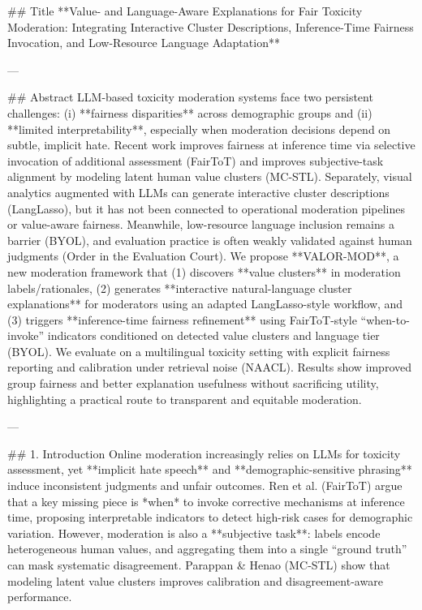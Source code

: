 ## Title
**Value- and Language-Aware Explanations for Fair Toxicity Moderation: Integrating Interactive Cluster Descriptions, Inference-Time Fairness Invocation, and Low-Resource Language Adaptation**

---

## Abstract
LLM-based toxicity moderation systems face two persistent challenges: (i) **fairness disparities** across demographic groups and (ii) **limited interpretability**, especially when moderation decisions depend on subtle, implicit hate. Recent work improves fairness at inference time via selective invocation of additional assessment (FairToT) and improves subjective-task alignment by modeling latent human value clusters (MC‑STL). Separately, visual analytics augmented with LLMs can generate interactive cluster descriptions (LangLasso), but it has not been connected to operational moderation pipelines or value-aware fairness. Meanwhile, low-resource language inclusion remains a barrier (BYOL), and evaluation practice is often weakly validated against human judgments (Order in the Evaluation Court).  
We propose **VALOR-MOD**, a new moderation framework that (1) discovers **value clusters** in moderation labels/rationales, (2) generates **interactive natural-language cluster explanations** for moderators using an adapted LangLasso-style workflow, and (3) triggers **inference-time fairness refinement** using FairToT-style “when-to-invoke” indicators conditioned on detected value clusters and language tier (BYOL). We evaluate on a multilingual toxicity setting with explicit fairness reporting and calibration under retrieval noise (NAACL). Results show improved group fairness and better explanation usefulness without sacrificing utility, highlighting a practical route to transparent and equitable moderation.

---

## 1. Introduction
Online moderation increasingly relies on LLMs for toxicity assessment, yet **implicit hate speech** and **demographic-sensitive phrasing** induce inconsistent judgments and unfair outcomes. Ren et al. (FairToT) argue that a key missing piece is *when* to invoke corrective mechanisms at inference time, proposing interpretable indicators to detect high-risk cases for demographic variation. However, moderation is also a **subjective task**: labels encode heterogeneous human values, and aggregating them into a single “ground truth” can mask systematic disagreement. Parappan & Henao (MC‑STL) show that modeling latent value clusters improves calibration and disagreement-aware performance.

